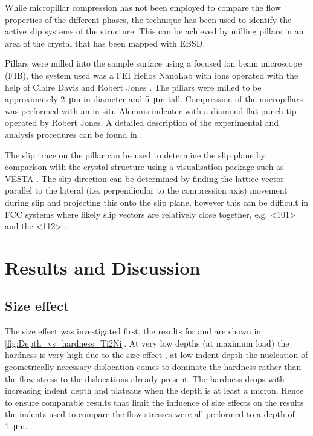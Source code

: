 While micropillar compression has not been employed to compare the flow properties of the different phases, the technique has been used to identify the active slip systems of the  structure. This can be achieved by milling pillars in an area of the crystal that has been mapped with EBSD. 

Pillars were milled into the sample surface using a focused ion beam microscope (FIB), the system used was a FEI Helios NanoLab with  ions operated with the help of Claire Davis \cite{Davis2015} and Robert Jones \cite{Jones2016}. The pillars were milled to be approximately \SI{2}{\micro\meter} in diameter and \SI{5}{\micro\meter} tall. Compression of the micropillars was performed with an in situ Alemnis indenter with a diamond flat punch tip operated by Robert Jones. A detailed description of the experimental and analysis procedures can be found in \cite{Davis2015}.

The slip trace on the pillar can be used to determine the slip plane by comparison with the crystal structure using a visualisation package such as VESTA \cite{Momma2011,Davis2015}. The slip direction can be determined by finding the lattice vector parallel to the lateral (i.e. perpendicular to the compression axis) movement during slip and projecting this onto the slip plane, however this can be difficult in FCC systems where likely slip vectors are relatively close together, e.g. <101> and the <112> \cite{Davis2015}.


\section{Results and Discussion}


\subsection{Size effect}


The size effect was investigated first, the results for  and  are shown in \autoref{fig:Depth_vs_hardness_Ti2Ni}. At very low depths (at maximum load) the hardness is very high due to the size effect \cite{Cripps2011}, at low indent depth the nucleation of geometrically necessary dislocation comes to dominate the hardness rather than the flow stress to the dislocations already present. The hardness drops with increasing indent depth and plateaus when the depth is at least a micron. Hence to ensure comparable results that limit the influence of size effects on the results the indents used to compare the flow stresses were all performed to a depth of \SI{1}{\micro\meter}. 

